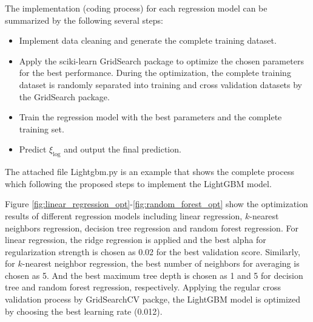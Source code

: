 \documentclass[12pt]{article}
\begin{document}
The implementation (coding process) for each regression model can be summarized by the following several steps:

\begin{itemize}
	\item Implement data cleaning and generate the complete training dataset.
\end{itemize}

\begin{itemize}
	\item Apply the sciki-learn GridSearch package to optimize the chosen parameters for the best performance. During the optimization, the complete training dataset is randomly separated into training and cross validation datasets by the GridSearch package.
\end{itemize}

\begin{itemize}
	\item Train the regression model with the best parameters and the complete training set.
\end{itemize}

\begin{itemize}
	\item Predict $\xi_{\log}$ and output the final prediction.
\end{itemize}
The attached file Lightgbm.py is an example that shows the complete process which following the proposed steps to implement the LightGBM model.

Figure \ref{fig:linear_regression_opt}-\ref{fig:random_forest_opt} show the optimization results of different regression models including linear regression, $k$-nearest neighbors regression, decision tree regression and random forest regression. For linear regression, the ridge regression is applied and the best alpha for regularization strength is chosen as 0.02 for the best validation score. Similarly, for $k$-nearest neighbor regression, the best number of neighbors for averaging is chosen as 5. And the best maximum tree depth is chosen as 1 and 5 for decision tree and random forest regression, respectively. Applying the regular cross validation process by GridSearchCV packge, the LightGBM model is optimized by choosing the best learning rate (0.012).
\end{document}
